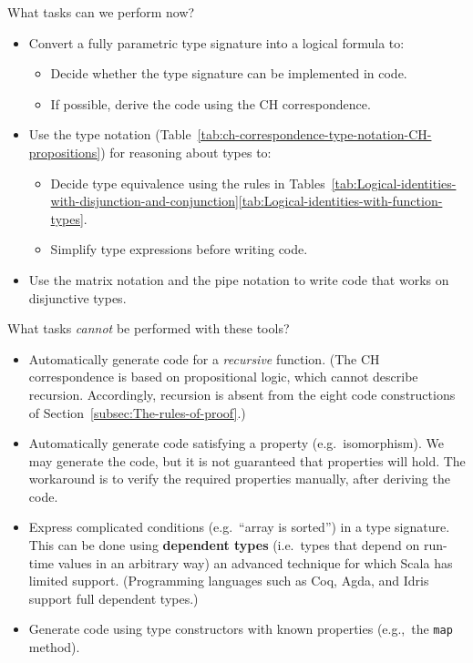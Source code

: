 What tasks can we perform now?
\begin{itemize}
\item Convert a fully parametric type signature into a logical formula to:
\begin{itemize}
\item Decide whether the type signature can be implemented in code.
\item If possible, derive the code using the CH correspondence.
\end{itemize}
\item Use the type notation (Table~\ref{tab:ch-correspondence-type-notation-CH-propositions})
for reasoning about types to:
\begin{itemize}
\item Decide type equivalence using the rules in Tables~\ref{tab:Logical-identities-with-disjunction-and-conjunction}\textendash \ref{tab:Logical-identities-with-function-types}.
\item Simplify type expressions before writing code.
\end{itemize}
\item Use the matrix notation and the pipe notation to write code that works
on disjunctive types.
\end{itemize}
What tasks \emph{cannot} be performed with these tools?
\begin{itemize}
\item Automatically generate code for a \emph{recursive} function. (The
CH correspondence is based on propositional logic, which cannot describe
recursion. Accordingly, recursion is absent from the eight code constructions
of Section~\ref{subsec:The-rules-of-proof}.)
\item Automatically generate code satisfying a property (e.g.\ isomorphism).
We may generate the code, but it is not guaranteed that properties
will hold. The workaround is to verify the required properties manually,
after deriving the code.
\item Express complicated conditions (e.g.\ \textsf{``}array is sorted\textsf{''}) in a
type signature. This can be done using \textbf{dependent types}
(i.e.~types that depend on run-time values in an arbitrary way) \textemdash{}
an advanced technique for which Scala has limited support. (Programming
languages such as Coq, Agda, and Idris support full dependent types.)
\item Generate code using type constructors with known properties (e.g.,\ the
\lstinline!map! method).
\end{itemize}
